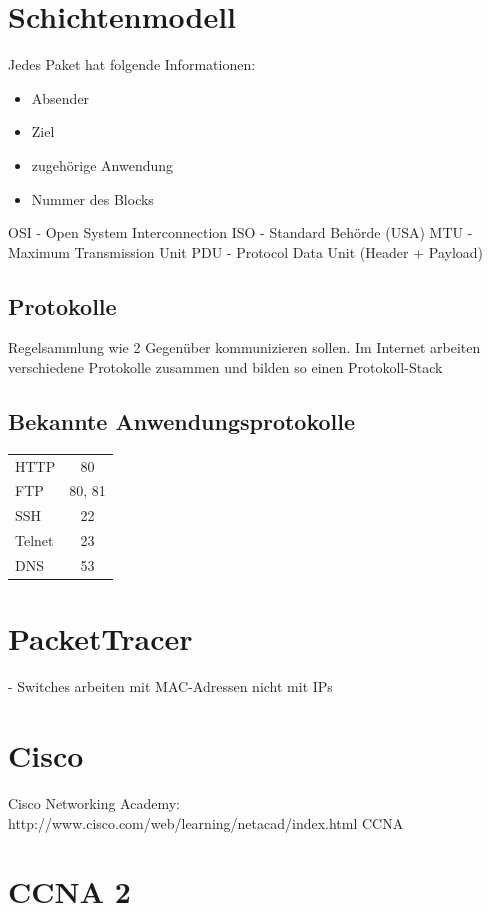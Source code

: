 \documentclass[11pt,a4paper]{article}
\begin{document}
\section{Schichtenmodell}
Jedes Paket hat folgende Informationen:
\begin{itemize}
\item Absender
\item Ziel
\item zugehörige Anwendung
\item Nummer des Blocks
\end{itemize}
OSI - Open System Interconnection\linebreak
ISO - Standard Behörde (USA)\linebreak
MTU - Maximum Transmission Unit\linebreak
PDU - Protocol Data Unit (Header + Payload)\linebreak
\subsection{Protokolle}
Regelsammlung wie 2 Gegenüber kommunizieren sollen. Im Internet arbeiten verschiedene Protokolle zusammen und bilden so einen Protokoll-Stack

\subsection{Bekannte Anwendungsprotokolle}
\begin{tabular}{l c}
HTTP & 80 \\
FTP & 80, 81 \\
SSH & 22 \\
Telnet & 23 \\
DNS & 53 \\
\end{tabular}



\section{PacketTracer}
- Switches arbeiten mit MAC-Adressen nicht mit IPs
\section{Cisco}
Cisco Networking Academy: 
http://www.cisco.com/web/learning/netacad/index.html
CCNA


\section{CCNA 2}
\end{document}
